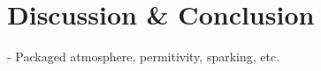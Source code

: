 \section{Discussion \& Conclusion}
\label{sec:conclusion}
- Packaged atmosphere, permitivity, sparking, etc.

